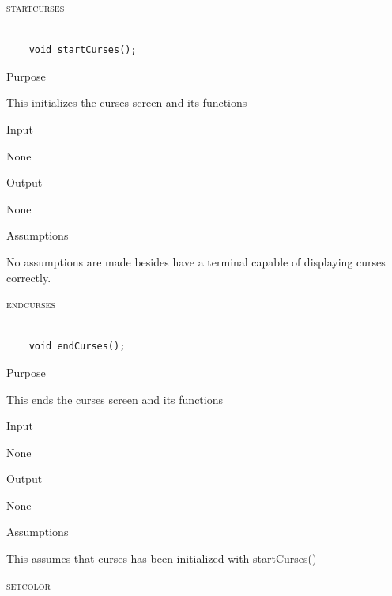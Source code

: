 \documentclass[pdftex, 11pt]{article}
\begin{document}
\begin{description}

	\item{\textsc{startcurses}}

		\begin{lstlisting}

	void startCurses();
		\end{lstlisting}

		\begin{description}
			\item{Purpose}

				This initializes the curses screen and its functions

			\item{Input}

				None

			\item{Output}

				None

			\item{Assumptions}

				No assumptions are made besides have a terminal
				capable of displaying curses correctly.

		\end{description}


	\item{\textsc{endcurses}}

		\begin{lstlisting}

	void endCurses();
		\end{lstlisting}

		\begin{description}
			\item{Purpose}

				This ends the curses screen and its functions

			\item{Input}

				None

			\item{Output}

				None

			\item{Assumptions}

				This assumes that curses has been initialized
				with startCurses()


		\end{description}


	\item{\textsc{setcolor}}


\end{description}
\end{document}
